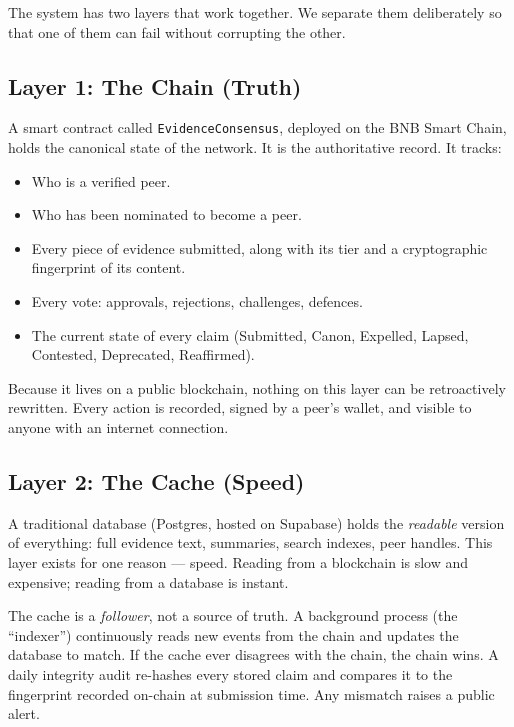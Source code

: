 \documentclass[11pt,a4paper]{article}
\begin{document}
The system has two layers that work together. We separate them
deliberately so that one of them can fail without corrupting the
other.

\subsection{Layer 1: The Chain (Truth)}

A smart contract called \texttt{EvidenceConsensus}, deployed on the
BNB Smart Chain, holds the canonical state of the network. It is the
authoritative record. It tracks:

\begin{itemize}[leftmargin=1.5em]
  \item Who is a verified peer.
  \item Who has been nominated to become a peer.
  \item Every piece of evidence submitted, along with its tier and
        a cryptographic fingerprint of its content.
  \item Every vote: approvals, rejections, challenges, defences.
  \item The current state of every claim
        (Submitted, Canon, Expelled, Lapsed, Contested, Deprecated,
        Reaffirmed).
\end{itemize}

Because it lives on a public blockchain, nothing on this layer can
be retroactively rewritten. Every action is recorded, signed by a
peer's wallet, and visible to anyone with an internet connection.

\subsection{Layer 2: The Cache (Speed)}

A traditional database (Postgres, hosted on Supabase) holds the
\emph{readable} version of everything: full evidence text, summaries,
search indexes, peer handles. This layer exists for one reason ---
speed. Reading from a blockchain is slow and expensive; reading
from a database is instant.

The cache is a \emph{follower}, not a source of truth. A background
process (the ``indexer'') continuously reads new events from the
chain and updates the database to match. If the cache ever disagrees
with the chain, the chain wins. A daily integrity audit re-hashes
every stored claim and compares it to the fingerprint recorded
on-chain at submission time. Any mismatch raises a public alert.
\end{document}

